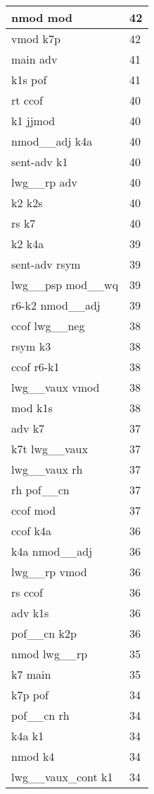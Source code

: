 \documentclass[a4 paper]{article}
\begin{document}
\begin{longtable}{p{}p{}}
nmod mod  & 42 \\ \midrule
vmod k7p  & 42 \\ \midrule
main adv  & 41 \\ \midrule
k1s pof  & 41 \\ \midrule
rt ccof  & 40 \\ \midrule
k1 jjmod  & 40 \\ \midrule
nmod\_\_adj k4a  & 40 \\ \midrule
sent-adv k1  & 40 \\ \midrule
lwg\_\_rp adv  & 40 \\ \midrule
k2 k2s  & 40 \\ \midrule
rs k7  & 40 \\ \midrule
k2 k4a  & 39 \\ \midrule
sent-adv rsym  & 39 \\ \midrule
lwg\_\_psp mod\_\_wq  & 39 \\ \midrule
r6-k2 nmod\_\_adj  & 39 \\ \midrule
ccof lwg\_\_neg  & 38 \\ \midrule
rsym k3  & 38 \\ \midrule
ccof r6-k1  & 38 \\ \midrule
lwg\_\_vaux vmod  & 38 \\ \midrule
mod k1s  & 38 \\ \midrule
adv k7  & 37 \\ \midrule
k7t lwg\_\_vaux  & 37 \\ \midrule
lwg\_\_vaux rh  & 37 \\ \midrule
rh pof\_\_cn  & 37 \\ \midrule
ccof mod  & 37 \\ \midrule
ccof k4a  & 36 \\ \midrule
k4a nmod\_\_adj  & 36 \\ \midrule
lwg\_\_rp vmod  & 36 \\ \midrule
rs ccof  & 36 \\ \midrule
adv k1s  & 36 \\ \midrule
pof\_\_cn k2p  & 36 \\ \midrule
nmod lwg\_\_rp  & 35 \\ \midrule
k7 main  & 35 \\ \midrule
k7p pof  & 34 \\ \midrule
pof\_\_cn rh  & 34 \\ \midrule
k4a k1  & 34 \\ \midrule
nmod k4  & 34 \\ \midrule
lwg\_\_vaux\_cont k1  & 34 \\ \midrule

\end{longtable}
\end{document}
